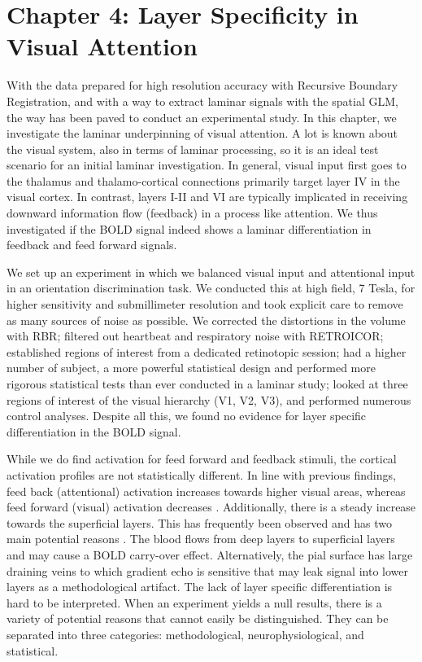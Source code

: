 \section*{Chapter 4: Layer Specificity in Visual Attention}
With the data prepared for high resolution accuracy with Recursive Boundary Registration, and with a way to extract laminar signals with the spatial GLM, the way has been paved to conduct an experimental study. In this chapter, we investigate the laminar underpinning of visual attention. A lot is known about the visual system, also in terms of laminar processing, so it is an ideal test scenario for an initial laminar investigation. In general, visual input first goes to the thalamus and thalamo-cortical connections primarily target layer IV in the visual cortex. In contrast, layers I-II and VI are typically implicated in receiving downward information flow (feedback) in a process like attention. We thus investigated if the BOLD signal indeed shows a laminar differentiation in feedback and feed forward signals. 

We set up an experiment in which we balanced visual input and attentional input in an orientation discrimination task. We conducted this at high field, 7 Tesla, for higher sensitivity and submillimeter resolution and took explicit care to remove as many sources of noise as possible. We corrected the distortions in the volume with RBR; filtered out heartbeat and respiratory noise with RETROICOR; established regions of interest from a dedicated retinotopic session; had a higher number of subject, a more powerful statistical design and performed more rigorous statistical tests than ever conducted in a laminar study; looked at three regions of interest of the visual hierarchy (V1, V2, V3), and performed numerous control analyses. Despite all this, we found no evidence for layer specific differentiation in the BOLD signal. 

While we do find activation for feed forward and feedback stimuli, the cortical activation profiles are not statistically different. In line with previous findings, feed back (attentional) activation increases towards higher visual areas, whereas feed forward (visual) activation decreases \cite{Murray2008,Jehee2011}. Additionally, there is a steady increase towards the superficial layers. This has frequently been observed and has two main potential reasons \cite{Koopmans2010,Polimeni2010}. The blood flows from deep layers to superficial layers and may cause a BOLD carry-over effect. Alternatively, the pial surface has large draining veins to which gradient echo is sensitive that may leak signal into lower layers as a methodological artifact. The lack of layer specific differentiation is hard to be interpreted. When an experiment yields a null results, there is a variety of potential reasons that cannot easily be distinguished. They can be separated into three categories: methodological, neurophysiological, and statistical. 

